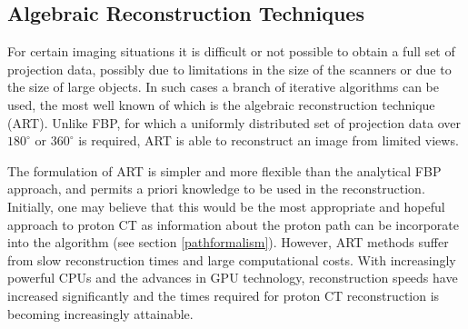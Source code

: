 \documentclass[11pt,a4paper]{article}
\begin{document}
\subsection{Algebraic Reconstruction Techniques}
For certain imaging situations it is difficult or not possible to obtain a full set of projection data, possibly due to limitations in the size of the scanners or due to the size of large objects. In such cases a branch of iterative algorithms can be used, the most well known of which is the algebraic reconstruction technique (ART). Unlike FBP, for which a uniformly distributed set of projection data over $180^{\circ}$ or $360^{\circ}$ is required, ART is able to reconstruct an image from limited views.

The formulation of ART is simpler and more flexible than the analytical FBP approach, and permits a priori knowledge to be used in the reconstruction. Initially, one may believe that this would be the most appropriate and hopeful approach to proton CT as information about the proton path can be incorporate into the algorithm (see section \ref{pathformalism}). However, ART methods suffer from slow reconstruction times and large computational costs. With increasingly powerful CPUs and the advances in GPU technology, reconstruction speeds have increased significantly and the times required for proton CT reconstruction is becoming increasingly attainable.
\end{document}
